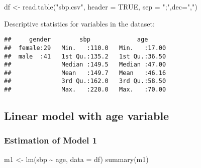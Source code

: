 \documentclass[
]{article}
\newenvironment{Shaded}{\begin{snugshade}}{\end{snugshade}}
\newcommand{\AttributeTok}[1]{\textcolor[rgb]{0.77,0.63,0.00}{#1}}
\newcommand{\ConstantTok}[1]{\textcolor[rgb]{0.00,0.00,0.00}{#1}}
\newcommand{\FunctionTok}[1]{\textcolor[rgb]{0.00,0.00,0.00}{#1}}
\newcommand{\NormalTok}[1]{#1}
\newcommand{\OtherTok}[1]{\textcolor[rgb]{0.56,0.35,0.01}{#1}}
\newcommand{\SpecialCharTok}[1]{\textcolor[rgb]{0.00,0.00,0.00}{#1}}
\newcommand{\StringTok}[1]{\textcolor[rgb]{0.31,0.60,0.02}{#1}}
\begin{document}
\begin{Shaded}
\begin{Highlighting}[]
\NormalTok{df }\OtherTok{\textless{}{-}}  \FunctionTok{read.table}\NormalTok{(}\StringTok{"sbp.csv"}\NormalTok{, }\AttributeTok{header =} \ConstantTok{TRUE}\NormalTok{, }\AttributeTok{sep =} \StringTok{";"}\NormalTok{,}\AttributeTok{dec=}\StringTok{","}\NormalTok{)}
\end{Highlighting}
\end{Shaded}

Descriptive statistics for variables in the dataset:

\begin{Shaded}
\end{Shaded}

\begin{verbatim}
##     gender        sbp             age       
##  female:29   Min.   :110.0   Min.   :17.00  
##  male  :41   1st Qu.:135.2   1st Qu.:36.50  
##              Median :149.5   Median :47.00  
##              Mean   :149.7   Mean   :46.16  
##              3rd Qu.:162.0   3rd Qu.:58.50  
##              Max.   :220.0   Max.   :70.00
\end{verbatim}

\hypertarget{linear-model-with-age-variable}{%
\subsection{Linear model with age
variable}\label{linear-model-with-age-variable}}

\hypertarget{estimation-of-model-1}{%
\subsubsection{Estimation of Model 1}\label{estimation-of-model-1}}

\begin{Shaded}
\begin{Highlighting}[]
\NormalTok{m1 }\OtherTok{\textless{}{-}} \FunctionTok{lm}\NormalTok{(sbp }\SpecialCharTok{\textasciitilde{}}\NormalTok{ age, }\AttributeTok{data =}\NormalTok{ df)}
\FunctionTok{summary}\NormalTok{(m1)}
\end{Highlighting}
\end{Shaded}
\end{document}
